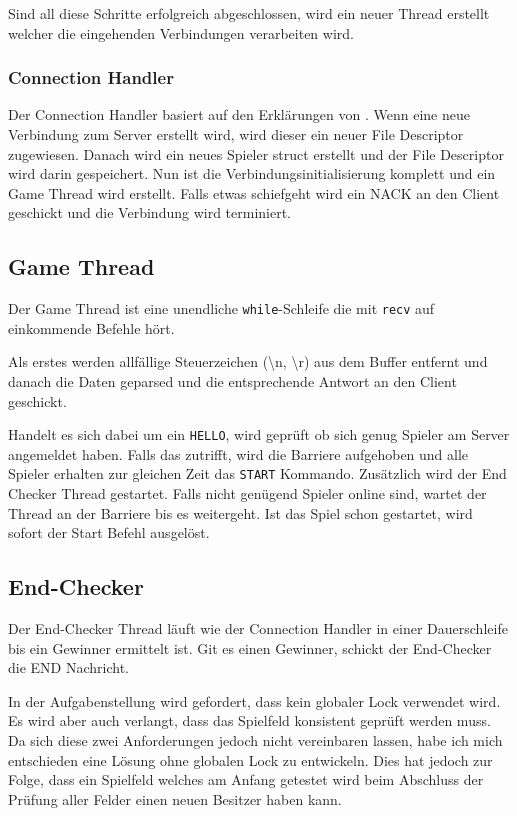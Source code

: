 Sind all diese Schritte erfolgreich abgeschlossen, wird ein neuer Thread erstellt welcher die eingehenden Verbindungen verarbeiten wird. 

\subsubsection{Connection Handler}
Der Connection Handler basiert auf den Erklärungen von \cite{byte-stream-server}. Wenn eine neue Verbindung zum Server erstellt wird, wird dieser ein neuer File Descriptor zugewiesen. 	Danach wird ein neues Spieler struct erstellt und der File Descriptor wird darin gespeichert. Nun ist die Verbindungsinitialisierung komplett und ein Game Thread wird erstellt. Falls etwas schiefgeht wird ein NACK an den Client geschickt und die Verbindung wird terminiert.

 
\subsection{Game Thread}
Der Game Thread ist eine unendliche \texttt{while}-Schleife die mit \texttt{recv} auf einkommende Befehle hört.

Als erstes werden allfällige Steuerzeichen (\textbackslash n, \textbackslash r) aus dem Buffer entfernt und danach die Daten geparsed und die entsprechende Antwort an den Client geschickt.

Handelt es sich dabei um ein \texttt{HELLO}, wird geprüft ob sich genug Spieler am Server angemeldet haben. Falls das zutrifft, wird die Barriere aufgehoben und alle Spieler erhalten zur gleichen Zeit das \texttt{START} Kommando. Zusätzlich wird der End Checker Thread gestartet. Falls nicht genügend Spieler online sind, wartet der Thread an der Barriere bis es weitergeht. Ist das Spiel schon gestartet, wird sofort der Start Befehl ausgelöst.


\subsection{End-Checker}
Der End-Checker Thread läuft wie der Connection Handler in einer Dauerschleife bis ein Gewinner ermittelt ist. Git es einen Gewinner, schickt der End-Checker die END Nachricht.

In der Aufgabenstellung wird gefordert, dass kein globaler Lock verwendet wird. Es wird aber auch verlangt, dass das Spielfeld konsistent geprüft werden muss. Da sich diese zwei Anforderungen jedoch nicht vereinbaren lassen, habe ich mich entschieden eine Lösung ohne globalen Lock zu entwickeln. Dies hat jedoch zur Folge, dass ein Spielfeld welches am Anfang getestet wird beim Abschluss der Prüfung aller Felder einen neuen Besitzer haben kann.

